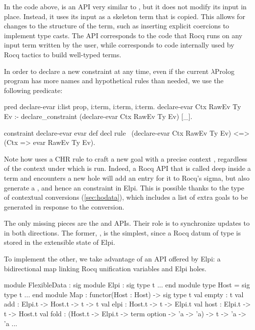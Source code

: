 \documentclass[a4paper, 11pt]{book}
\begin{document}
\noindent
In the code above,  is an API very similar to
, but it does not modify its input in place. Instead, it
uses its input as a skeleton term that is copied. This allows for changes to
the structure of the term, such as inserting explicit coercions to implement
type casts. The API corresponds to the code that Rocq runs on any input term
written by the user, while  corresponds to code
internally used by Rocq tactics to build well-typed terms.

In order to declare a new  constraint at any time, even if the
current $\lambda$Prolog program has more names and hypothetical rules than
needed, we use the following predicate:

\begin{elpicode}
pred declare-evar i:list prop, i:term, i:term, i:term.
declare-evar Ctx RawEv Ty Ev :-
  declare_constraint (declare-evar Ctx RawEv Ty Ev) [_].

constraint declare-evar evar def decl {
  rule \ (declare-evar Ctx RawEv Ty Ev)
     <=> (Ctx => evar RawEv Ty Ev).
}
\end{elpicode}

\noindent
Note how  uses a CHR rule to craft a new goal with a
precise context , regardless of the context under which
 is run. Indeed, a Rocq API that is called deep
inside a term and encounters a new hole will add an entry for it to Rocq's
sigma, but also generate a , and hence an 
constraint in Elpi. This is possible thanks to the type of contextual
conversions (\cref{sec:hodata}), which includes a list of extra goals to be generated in response
to the conversion.

The only missing pieces are the  and 
APIs. Their role is to synchronize updates to  in both
directions. The former, , is the simplest, since a Rocq
datum of type  is stored in the extensible state of Elpi.

To implement the other, we take advantage of an API offered by Elpi: a
bidirectional map linking Rocq unification variables and Elpi holes.

\begin{ocamlcode}
module FlexibleData : sig
  module Elpi : sig type t ... end
  module type Host = sig type t ... end
  module Map : functor(Host : Host) -> sig
    type t
    val empty : t
    val add : Elpi.t -> Host.t -> t -> t
    val elpi   : Host.t -> t -> Elpi.t
    val host : Elpi.t -> t -> Host.t
    val fold : (Host.t -> Elpi.t -> term option -> 'a -> 'a) -> t -> 'a -> 'a
    ...
\end{ocamlcode}
\end{document}
